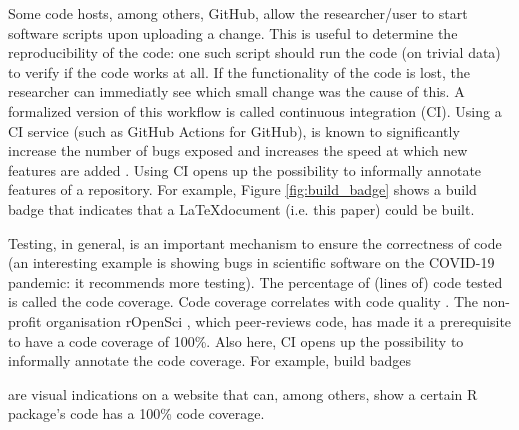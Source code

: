 Some code hosts, among others, GitHub, 
allow the researcher/user to start software scripts upon uploading a change.
This is useful to determine the reproducibility of the code: 
one such script should run the code (on trivial data) 
to verify if the code works at all.
If the functionality of the code is lost, the researcher
can immediatly see which small change was the cause of this.
A formalized version of this workflow is called continuous integration (CI).
Using a CI service (such as GitHub Actions for GitHub), 
is known to significantly 
increase the number of bugs exposed \cite{vasilescu2015} and increases
the speed at which new features are added \cite{vasilescu2015}.
Using CI opens up the possibility to informally annotate features of
a repository. For example, Figure \ref{fig:build_badge} shows a 
build badge that indicates that a \LaTeX document (i.e. this paper)
could be built.

Testing, in general, is an important mechanism to ensure
the correctness of code (an interesting example is \cite{rahman2020exploratory}
showing bugs in scientific software on the COVID-19 pandemic:
it recommends more testing).
The percentage of (lines of) code tested is called the code coverage.
Code coverage correlates with code quality \cite{horgan1994,del1995correlation}. 
The non-profit organisation rOpenSci \cite{ram2018community},
which peer-reviews code,
has made it a prerequisite to have a code coverage of 100\%.
Also here, CI opens up the possibility to informally annotate the
code coverage. 
For example, build badges

are visual indications on a website that can, among others,
show a certain R package's code has a 100\% code coverage.

